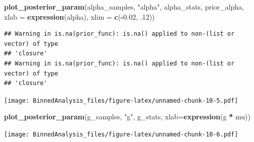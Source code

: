 \documentclass[
]{article}
\newenvironment{Shaded}{\begin{snugshade}}{\end{snugshade}}
\newcommand{\AttributeTok}[1]{\textcolor[rgb]{0.13,0.29,0.53}{#1}}
\newcommand{\DecValTok}[1]{\textcolor[rgb]{0.00,0.00,0.81}{#1}}
\newcommand{\FloatTok}[1]{\textcolor[rgb]{0.00,0.00,0.81}{#1}}
\newcommand{\FunctionTok}[1]{\textcolor[rgb]{0.13,0.29,0.53}{\textbf{#1}}}
\newcommand{\NormalTok}[1]{#1}
\newcommand{\SpecialCharTok}[1]{\textcolor[rgb]{0.81,0.36,0.00}{\textbf{#1}}}
\newcommand{\StringTok}[1]{\textcolor[rgb]{0.31,0.60,0.02}{#1}}
\begin{document}
\begin{Shaded}
\begin{Highlighting}[]
\FunctionTok{plot\_posterior\_param}\NormalTok{(alpha\_samples, }\StringTok{"alpha"}\NormalTok{, alpha\_stats, prior\_alpha, }\AttributeTok{xlab =} \FunctionTok{expression}\NormalTok{(alpha), }\AttributeTok{xlim =} \FunctionTok{c}\NormalTok{(}\SpecialCharTok{{-}}\FloatTok{0.02}\NormalTok{, .}\DecValTok{12}\NormalTok{))}
\end{Highlighting}
\end{Shaded}

\begin{verbatim}
## Warning in is.na(prior_func): is.na() applied to non-(list or vector) of type
## 'closure'
## Warning in is.na(prior_func): is.na() applied to non-(list or vector) of type
## 'closure'
\end{verbatim}

\texttt{[image: BinnedAnalysis\_files/figure-latex/unnamed-chunk-10-5.pdf]}

\begin{Shaded}
\begin{Highlighting}[]
\FunctionTok{plot\_posterior\_param}\NormalTok{(g\_samples, }\StringTok{"g"}\NormalTok{, g\_stats, }\AttributeTok{xlab=}\FunctionTok{expression}\NormalTok{(}\StringTok{\textquotesingle{}g\textquotesingle{}} \SpecialCharTok{*}\NormalTok{ mu))}
\end{Highlighting}
\end{Shaded}

\texttt{[image: BinnedAnalysis\_files/figure-latex/unnamed-chunk-10-6.pdf]}
\end{document}
